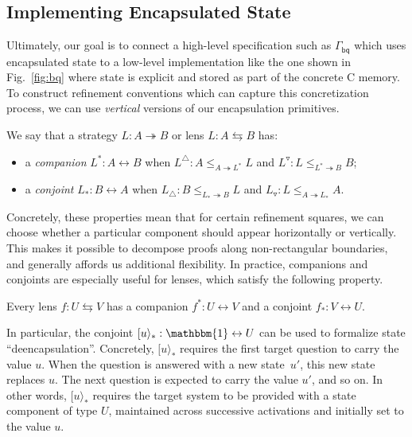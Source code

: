 \documentclass[acmsmall,screen,review,nonacm]{acmart}
\newcommand{\kw}[1]{\ensuremath{ \mathsf{#1} }}
\newcommand{\lensarrow}{\leftrightarrows}
\begin{document}

\subsection{Implementing Encapsulated State} %

Ultimately, our goal
is to connect a high-level specification such as $\Gamma_\kw{bq}$
which uses encapsulated state
to a low-level implementation like the one shown in Fig.~\ref{fig:bq}
where state is explicit and stored as part of the concrete C memory.
To construct refinement conventions
which can capture this concretization process,
we can use \emph{vertical} versions of our encapsulation primitives.

\begin{definition} %
We say that a strategy $L : A \twoheadrightarrow B$
or lens $L : A \leftrightarrows B$
has:
\begin{itemize}
  \item a \emph{companion} $L^* : A \leftrightarrow B$ when
    $L^\triangle : A \le_{A \twoheadrightarrow L^*} L$
    and
    $L^\triangledown : L \le_{L^* \twoheadrightarrow B} B$;
  \item a \emph{conjoint} $L_* : B \leftrightarrow A$ when
    $L_\triangle : B \le_{L_* \twoheadrightarrow B} L$
    and
    $L_\triangledown : L \le_{A \twoheadrightarrow L_*} A$.
\end{itemize}
\end{definition}

Concretely,
these properties mean that for certain refinement squares,
we can choose
whether a particular component
should appear horizontally or vertically.
This makes it possible to decompose proofs
along non-rectangular boundaries,
and generally affords us additional flexibility.
%
In practice,
companions and conjoints
are especially useful for lenses,
which satisfy the following property.

\begin{theorem}
Every lens $f : U \lensarrow V$
has a companion $f^* : U \leftrightarrow V$
and a conjoint $f_* : V \leftrightarrow U$.
\end{theorem}

In particular,
the conjoint
$[u\rangle_* : \mathbbm{1} \leftrightarrow U$
can be used to formalize state ``deencapsulation''.
Concretely, $[u\rangle_*$ requires the first target question
to carry the value $u$.
When the question is answered with a new state~$u'$,
this new state replaces $u$.
The next question is
expected to carry the value $u'$,
and so on.
In other words,
$[u\rangle_*$
requires the target system to be provided with a state component of type $U$,
maintained across successive activations and
initially set to the value $u$.
\end{document}
